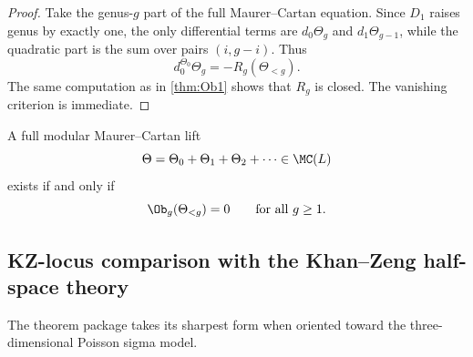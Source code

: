 \begin{proof}
Take the genus-$g$ part of the full Maurer--Cartan equation. Since $D_1$ raises genus by
exactly one, the only differential terms are $d_0\Theta_g$ and $d_1\Theta_{g-1}$, while the
quadratic part is the sum over pairs $(i,g-i)$. Thus
\[
d_0^{\Theta_0}\Theta_g=-R_g(\Theta_{<g}).
\]
The same computation as in \cref{thm:Ob1} shows that $R_g$ is closed. The vanishing
criterion is immediate.
\end{proof}

\begin{corollary}
A full modular Maurer--Cartan lift
\[
\Theta=\Theta_0+\Theta_1+\Theta_2+\cdots\in \MC(L)
\]
exists if and only if
\[
\Ob_g(\Theta_{<g})=0
\qquad\text{for all }g\ge 1.
\]
\end{corollary}

\subsection{KZ-locus comparison with the Khan--Zeng half-space theory}

The theorem package takes its sharpest form when oriented toward the
three-dimensional Poisson sigma model.

